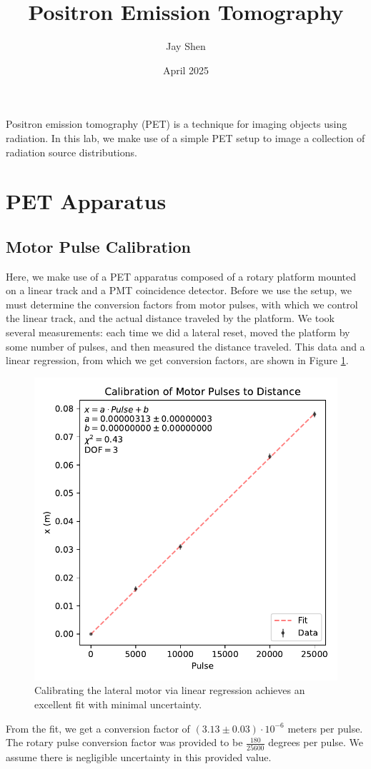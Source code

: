 \documentclass[12pt, letterpaper]{article}
\title{Positron Emission Tomography}
\author{Jay Shen}
\date{April 2025}
\begin{document}
\maketitle

Positron emission tomography (PET) is a technique for imaging objects using radiation. In this lab, we make use of a simple PET setup to image a collection of radiation source distributions. 

\section{PET Apparatus}

\subsection{Motor Pulse Calibration}

Here, we make use of a PET apparatus composed of a rotary platform mounted on a linear track and a PMT coincidence detector. Before we use the setup, we must determine the conversion factors from motor pulses, with which we control the linear track, and the actual distance traveled by the platform. We took several measurements: each time we did a lateral reset, moved the platform by some number of pulses, and then measured the distance traveled. This data and a linear regression, from which we get conversion factors, are shown in Figure \ref{fig:calibration}. 
\begin{figure}
    \centering
    \includegraphics[width=0.5\linewidth]{experiment5/figures/calibration.pdf}
    \caption{Calibrating the lateral motor via linear regression achieves an excellent fit with minimal uncertainty.}
    \label{fig:calibration}
\end{figure}
From the fit, we get a conversion factor of $(3.13 \pm 0.03) \cdot 10^{-6}$ meters per pulse. The rotary pulse conversion factor was provided to be $\frac{180}{25600}$ degrees per pulse. We assume there is negligible uncertainty in this provided value. 
\end{document}
